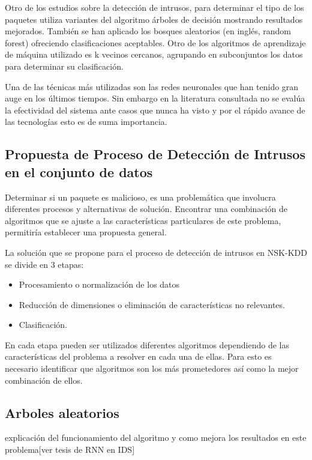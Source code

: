 Otro de los estudios sobre la detección de intrusos, para determinar el tipo de los paquetes utiliza variantes del algoritmo árboles de decisión mostrando resultados mejorados. También se han aplicado los bosques aleatorios (en inglés, random forest) ofreciendo clasificaciones aceptables. Otro de los algoritmos de aprendizaje de máquina utilizado es k vecinos cercanos, agrupando en subconjuntos los datos para determinar su clasificación.

Una de las técnicas más utilizadas son las redes neuronales que han tenido gran auge en los últimos tiempos. Sin embargo en la literatura consultada no se evalúa la efectividad del sistema ante casos que nunca ha visto y por el rápido avance de las tecnologías esto es de suma importancia.

\subsection{Propuesta de Proceso de Detección de Intrusos en el conjunto de datos}
Determinar si un paquete es malicioso, es una problemática que involucra diferentes procesos y alternativas de solución. Encontrar una combinación de algoritmos que se ajuste a las características particulares de este problema, permitiría establecer una propuesta general.

La solución que se propone para el proceso de detección de intrusos en NSK-KDD se divide en 3 etapas:

\begin{itemize}
    \item Procesamiento o normalización de los datos
    \item Reducción de dimensiones o eliminación de características no relevantes.
    \item Clasificación.
\end{itemize}

En cada etapa pueden ser utilizados diferentes algoritmos dependiendo de las características del problema a resolver en cada una de ellas. Para esto es necesario identificar que algoritmos son los más prometedores así como la mejor combinación de ellos.

\subsection{Arboles aleatorios}
explicación del funcionamiento del algoritmo y como mejora los resultados en este problema[ver tesis de RNN en IDS]